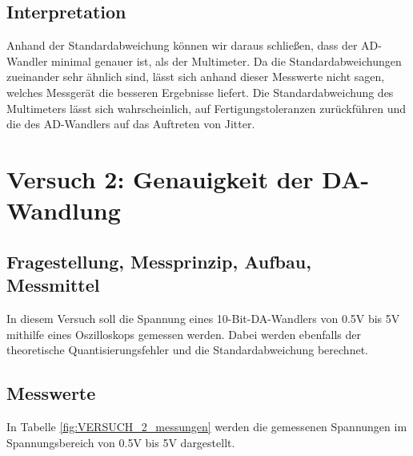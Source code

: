 \documentclass[12pt, oneside, a4paper, \docLanguage]{report}
\begin{document}
\section{Interpretation}
\label{chap:VERSUCH_1_INTERPRETATION}
Anhand der Standardabweichung können wir daraus schließen, dass der AD-Wandler minimal genauer ist, als der Multimeter. Da die Standardabweichungen zueinander sehr ähnlich sind, lässt sich anhand dieser Messwerte nicht sagen, welches Messgerät die besseren Ergebnisse liefert. 
Die Standardabweichung des Multimeters lässt sich wahrscheinlich, auf Fertigungstoleranzen zurückführen und die des AD-Wandlers auf das Auftreten von Jitter.

%
%
\chapter{Versuch 2: Genauigkeit der DA-Wandlung}
\label{chap:VERSUCH_2}

\section{Fragestellung, Messprinzip, Aufbau, Messmittel}
\label{chap:VERSUCH_2_FRAGESTELLUNG}
In diesem Versuch soll die Spannung eines 10-Bit-DA-Wandlers von 0.5V bis 5V mithilfe eines Oszilloskops gemessen werden. Dabei werden ebenfalls der theoretische Quantisierungsfehler und die Standardabweichung berechnet.

\section{Messwerte}
\label{chap:VERSUCH_2_MESSWERTE}
In Tabelle \ref{fig:VERSUCH_2_messungen} werden die gemessenen Spannungen im Spannungsbereich von 0.5V bis 5V dargestellt.
\end{document}
